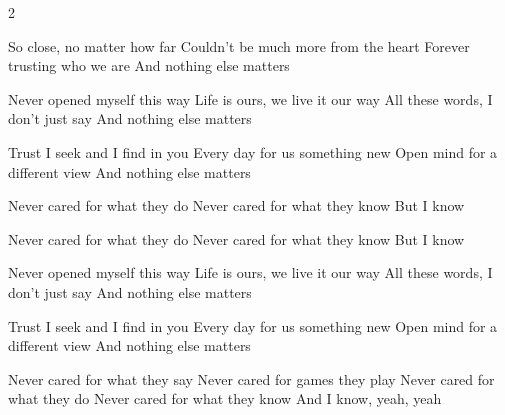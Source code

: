 \vspace*{0.07\textheight}

\begin{paracol}{2}
\begin{guitar}
  \begin{slimhighlightbar}
    So close, no matter how far
    Couldn't be much more from the heart
    Forever trusting who we are
    And nothing else matters
  \end{slimhighlightbar}

  Never opened myself this way
  Life is ours, we live it our way
  All these words, I don't just say
  And nothing else matters

  Trust I seek and I find in you
  Every day for us something new
  Open mind for a different view
  And nothing else matters

  \begin{highlightbar}
    Never cared for what they do
    Never cared for what they know
    But I know
  \end{highlightbar}
\end{guitar}

\switchcolumn

\begin{guitar}
  \begin{slimhighlightbar}
  \end{slimhighlightbar}

  \begin{highlightbar}
    Never cared for what they do
    Never cared for what they know
    But I know
  \end{highlightbar}

  Never opened myself this way
  Life is ours, we live it our way
  All these words, I don't just say
  And nothing else matters

  Trust I seek and I find in you
  Every day for us something new
  Open mind for a different view
  And nothing else matters

  Never cared for what they say
  Never cared for games they play
  Never cared for what they do
  Never cared for what they know
  And I know, yeah, yeah

  \begin{slimhighlightbar}
  \end{slimhighlightbar}
\end{guitar}
\end{paracol}
